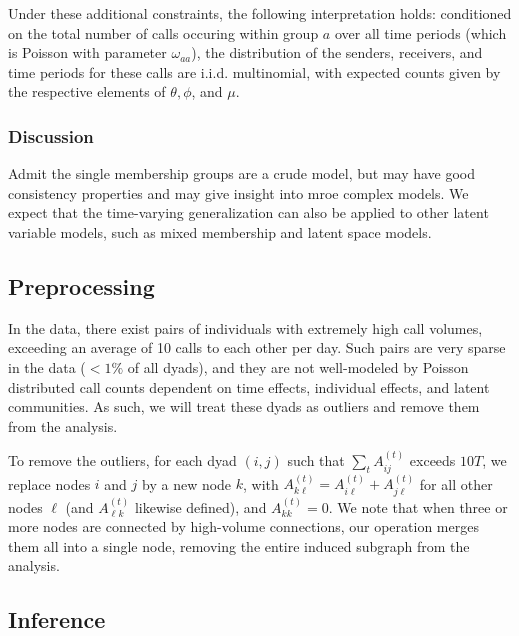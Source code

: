 \documentclass{article}
\begin{document}
Under these additional constraints, the following interpretation holds: conditioned on the total number of calls occuring within group $a$ over all time periods (which is Poisson with parameter $\omega_{aa}$), the distribution of the senders, receivers, and time periods for these calls are i.i.d. multinomial, with expected counts given by the respective elements of $\theta, \phi$, and $\mu$.


\subsubsection{Discussion}
Admit the single membership groups are a crude model, but may have good consistency properties and may give insight into mroe complex models. We expect that the time-varying generalization can also be applied to other latent variable models, such as mixed membership  and latent space models.

\subsection{Preprocessing}

In the data, there exist pairs of individuals with extremely high call volumes, exceeding an average of 10 calls to each other per day. Such pairs are very sparse in the data ($<1 \%$ of all dyads), and they are not well-modeled by Poisson distributed call counts dependent on time effects, individual effects, and latent communities. As such, we will treat these dyads as outliers and remove them from the analysis.

To remove the outliers, for each dyad $(i,j)$ such that $\sum_{t} A_{ij}^{(t)}$ exceeds $10T$, we replace nodes $i$ and $j$ by a new node $k$, with $A_{k\ell}^{(t)} = A_{i\ell}^{(t)}+A_{j\ell}^{(t)}$ for all other nodes $\ell$ (and $A_{\ell k}^{(t)}$ likewise defined), and $A_{kk}^{(t)} = 0$. We note that when three or more nodes are connected by high-volume connections, our operation merges them all into a single node, removing the entire induced subgraph from the analysis.


\subsection{Inference} \label{sec:inference}
\end{document}
